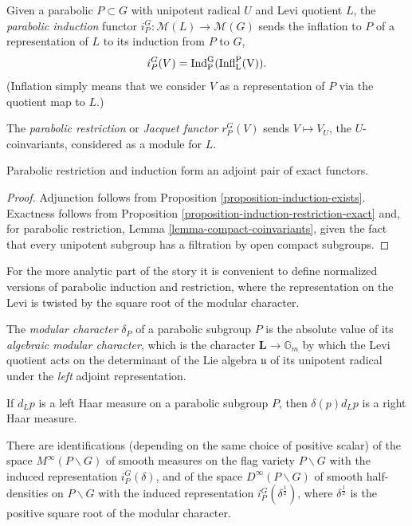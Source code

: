 \begin{definition}
	\label{definition-parabolic-induction-restriction}
	Given a parabolic $P\subset G$ with unipotent radical $U$ and Levi quotient $L$, the {\it parabolic induction} functor $i_P^G:\mathcal M(L)\to \mathcal M(G)$ sends the inflation to $P$ of a representation of $L$ to its induction from $P$ to $G$,
	$$ i_P^G(V) = \rm{Ind}_P^G(\rm{Infl}_L^P(V)).$$
	(Inflation simply means that we consider $V$ as a representation of $P$ via the quotient map to $L$.)
	
	The {\it parabolic restriction} or {\it Jacquet functor} $r^G_P(V)$ sends $V\mapsto V_U$, the $U$-coinvariants, considered as a module for $L$.
\end{definition}


\begin{proposition}
	\label{proposition-Jacquet-exact}
	Parabolic restriction and induction form an adjoint pair of exact functors.
\end{proposition}

\begin{proof}
	Adjunction follows from Proposition \ref{proposition-induction-exists}. Exactness follows from Proposition \ref{proposition-induction-restriction-exact} and, for parabolic restriction, Lemma \ref{lemma-compact-coinvariants}, given the fact that every unipotent subgroup has a filtration by open compact subgroups.
\end{proof}


For the more analytic part of the story it is convenient to define normalized versions of parabolic induction and restriction, where the representation on the Levi is twisted by the square root of the modular character. 

\begin{definition}
	\label{definition-modular-character}
	The {\it modular character} $\delta_P$ of a parabolic subgroup $P$ is the absolute value of its \emph{algebraic modular character}, which is the character $\mathbf L\to \mathbb G_m$ by which the Levi quotient acts on the determinant of the Lie algebra $\mathfrak u$ of its unipotent radical under the \emph{left} adjoint representation. 
\end{definition}

\begin{proposition}
	\label{proposition-modular-character}
	If $d_Lp$ is a left Haar measure on a parabolic subgroup $P$, then $\delta(p)d_Lp$ is a right Haar measure. 
	
	There are identifications (depending on the same choice of positive scalar) of the space $M^\infty(P\backslash G)$ of smooth measures on the flag variety $P\backslash G$ with the induced representation $i_P^G(\delta)$, and of the space $D^\infty(P\backslash G)$ of smooth half-densities on $P\backslash G$ with the induced representation $i_P^G(\delta^\frac{1}{2})$, where $\delta^\frac{1}{2}$ is the positive square root of the modular character.		
\end{proposition}

